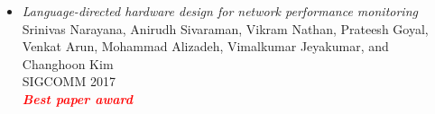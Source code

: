 \documentclass[notitlepage]{article}
\newcommand{\highlight}[1]{\textcolor{red}{\textit{\textbf{#1}}}}
\begin{document}
\begin{itemize}[noitemsep,nolistsep]
      Venkat Arun and Hari Balakrishnan\\
      NSDI 2018\\
              \highlight{Being used in production at Meta}\\
              \item {\it Language-directed hardware design for network performance monitoring}\label{paper:marple}\\
      Srinivas Narayana, Anirudh Sivaraman, Vikram Nathan, Prateesh Goyal, Venkat Arun, Mohammad Alizadeh, Vimalkumar Jeyakumar, and Changhoon Kim\\
      SIGCOMM 2017\\
              \highlight{Best paper award}\\
        \end{itemize}
\end{document}
